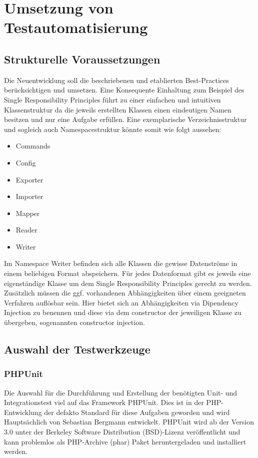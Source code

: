 \newpage
\section{Umsetzung von Testautomatisierung}\label{umsetzung}

\subsection{Strukturelle Voraussetzungen}
Die Neuentwicklung soll die beschriebenen und etablierten Best-Practices berücksichtigen und umsetzen. Eine Konsequente Einhaltung zum Beispiel des Single Responsibility Principles führt zu einer einfachen und intuitiven Klassenstruktur da die jeweils erstellten Klassen einen eindeutigen Namen besitzen und nur eine Aufgabe erfüllen. Eine exemplarische Verzeichnisstruktur und sogleich auch Namespacestruktur könnte somit wie folgt aussehen: 

\begin{itemize}
	\item Commands
	\item Config
	\item Exporter
	\item Importer
	\item Mapper
	\item Reader
	\item Writer
\end{itemize}

Im Namespace Writer befinden sich alle Klassen die gewisse Datenströme in einem beliebigen Format abspeichern. Für jedes Datenformat gibt es jeweils eine eigenständige Klasse um dem Single Responsibility Principles gerecht zu werden. Zusätzlich müssen die ggf. vorhandenen Abhängigkeiten über einem geeigneten Verfahren auflösbar sein. Hier bietet sich an Abhängigkeiten via Dipendency Injection zu benennen und diese via dem constructor der jeweiligen Klasse zu übergeben, sogenannten constructor injection.

\subsection{Auswahl der Testwerkzeuge}
\subsubsection{PHPUnit}
Die Auswahl für die Durchführung und Erstellung der benötigten Unit- und Integrationstest viel auf das Framework PHPUnit. Dies ist in der PHP-Entwicklung der defakto Standard für diese Aufgaben geworden und wird Hauptsächlich von Sebastian Bergmann entwickelt. PHPUnit wird ab der Version 3.0 unter der Berkeley Software Distribution (BSD)-Lizenz veröffentlicht und kann problemlos als PHP-Archive (phar) Paket heruntergeladen und installiert werden.

